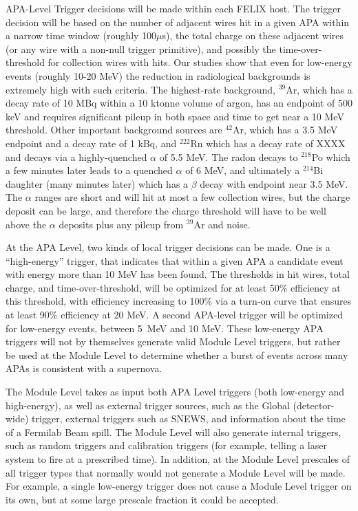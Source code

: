 	APA-Level Trigger decisions will be made within each FELIX
host.  The trigger decision will be based on the number of adjacent wires hit
in a given APA within a narrow time window (roughly 100$\mu$s), the total
charge on these adjacent wires (or any wire with a non-null trigger primitive),
and possibly the time-over-threshold for collection wires with hits. Our
studies show that even for low-energy events (roughly 10-20 MeV) the reduction
in radiological backgrounds is extremely high with such criteria. The
highest-rate background, $^{39}$Ar, which has a decay rate of 10 MBq within a
10 ktonne volume of argon, has an endpoint of 500 keV and requires significant
pileup in both space and time to get near a 10 MeV threshold. Other important
background sources are $^{42}$Ar, which has a 3.5 MeV endpoint and a decay rate
of 1 kBq, and $^{222}$Rn which has a decay rate of XXXX and decays via a
highly-quenched $\alpha$ of 5.5 MeV.  The radon decays to $^{218}$Po which
a few minutes later leads to a quenched $\alpha$ of 6 MeV, and ultimately a
$^{214}$Bi daughter (many minutes later) which has a $\beta$ decay with
endpoint near 3.5 MeV.  The $\alpha$ ranges are short and will hit at most a
few collection wires, but the charge deposit can be large, and therefore the
charge threshold will have to be well above the $\alpha$ deposits plus any
pileup from $^{39}$Ar and noise.

	At the APA Level, two kinds of local trigger decisions can be made. One
is a ``high-energy'' trigger, that indicates that within a given APA a
candidate event with energy more than 10 MeV has been found. The thresholds in
hit wires, total charge, and time-over-threshold, will be optimized for at
least 50\% efficiency at this threshold, with efficiency increasing to 100\%
via a turn-on curve that ensures at least 90\% efficiency at 20 MeV.  
A second APA-level trigger will be optimized for low-energy events, between 
5~MeV and 10 MeV. These low-energy APA triggers will not by themselves generate
valid  Module Level triggers, but rather be used at the Module Level to
determine whether a burst of events across many APAs is consistent with a
supernova.

	The Module Level takes as input both APA Level triggers (both
low-energy and high-energy), as well as external trigger sources, such as the
Global (detector-wide) trigger, external triggers such as SNEWS, and
information about the time of a Fermilab Beam spill.  The Module Level will
also generate internal triggers, such as random triggers and calibration
triggers (for example, telling a laser system to fire at a prescribed time). 
In addition, at the Module Level prescales of all trigger types that normally
would not generate a Module Level will be made. For example, a single
low-energy trigger does not cause a Module Level trigger on its own, but at
some large prescale fraction it could be accepted.

